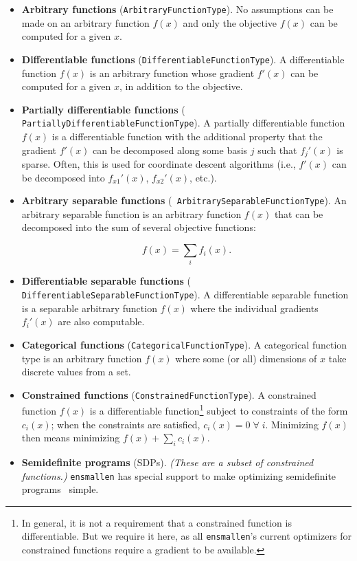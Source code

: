 \begin{itemize}
\item {\bf Arbitrary functions} ({\tt \small ArbitraryFunctionType}).  No
assumptions can be made on an arbitrary function $f(x)$ and only the objective
$f(x)$ can be computed for a given $x$.

\item {\bf Differentiable functions} ({\tt \small DifferentiableFunctionType}).
A differentiable function $f(x)$ is an arbitrary function whose gradient $f'(x)$
can be computed for a given $x$, in addition to the objective.

\item {\bf Partially differentiable functions} ({\tt \small
PartiallyDifferentiableFunctionType}).  A partially differentiable function
$f(x)$ is a differentiable function with the additional property that the
gradient $f'(x)$ can be decomposed along some basis $j$ such that $f_j'(x)$ is
sparse.  Often, this is used for coordinate descent algorithms (i.e., $f'(x)$
can be decomposed into $f_{x1}'(x)$, $f_{x2}'(x)$, etc.).

\item {\bf Arbitrary separable functions} ({\tt \small
ArbitrarySeparableFunctionType}).  An arbitrary separable function is an
arbitrary function $f(x)$ that can be decomposed into the sum of several
objective functions:

\begin{equation}
f(x) = \sum_i f_i(x).
\end{equation}

\item {\bf Differentiable separable functions} ({\tt \small
DifferentiableSeparableFunctionType}).  A differentiable separable function is a
separable arbitrary function $f(x)$ where the individual gradients $f_i'(x)$ are
also computable.

\item {\bf Categorical functions} ({\tt \small CategoricalFunctionType}).  A
categorical function type is an arbitrary function $f(x)$ where some (or all)
dimensions of $x$ take discrete values from a set.

\item {\bf Constrained functions} ({\tt \small ConstrainedFunctionType}).  A
constrained function $f(x)$ is a differentiable function\footnote{In general, it
is not a requirement that a constrained function is differentiable.  But we
require it here, as all {\tt ensmallen}'s current optimizers for constrained
functions require a gradient to be available.} subject to constraints of the
form $c_i(x)$; when the constraints are satisfied, $c_i(x) = 0\; \forall \; i$.
Minimizing $f(x)$ then means minimizing $f(x) + \sum_i c_i(x)$.

\item {\bf Semidefinite programs} (SDPs).  {\it (These are a subset of
constrained functions.)}  {\tt ensmallen} has special
support to make optimizing semidefinite
programs~\cite{vandenberghe1996semidefinite} simple.
\end{itemize}

